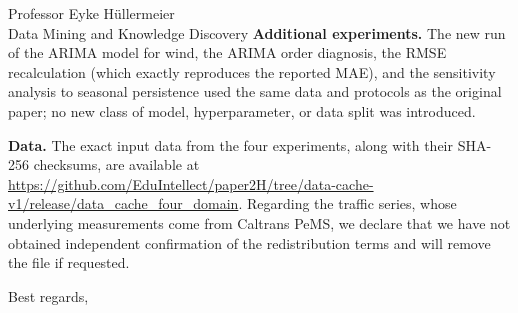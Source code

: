\documentclass[10pt,a4paper]{letter}
\begin{document}
\begin{letter}{Professor Eyke H\"ullermeier\\Data Mining and Knowledge Discovery}
\textbf{Additional experiments.} The new run of the ARIMA model for wind, the ARIMA order diagnosis, the RMSE recalculation (which exactly reproduces the reported MAE), and the sensitivity analysis to seasonal persistence used the same data and protocols as the original paper; no new class of model, hyperparameter, or data split was introduced.

\textbf{Data.} The exact input data from the four experiments, along with their SHA-256 checksums, are available at \url{https://github.com/EduIntellect/paper2H/tree/data-cache-v1/release/data_cache_four_domain}. Regarding the traffic series, whose underlying measurements come from Caltrans PeMS, we declare that we have not obtained independent confirmation of the redistribution terms and will remove the file if requested.

\closing{Best regards,}
\end{letter}
\end{document}
